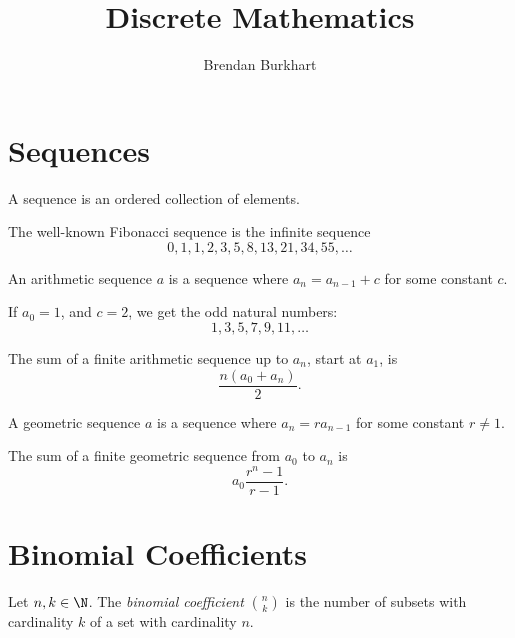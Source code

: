 \documentclass[12pt]{article}
\begin{document}
\title{Discrete Mathematics}
\author{Brendan Burkhart}
\maketitle

\tableofcontents
\newpage

\section{Sequences}

\begin{defn}
    A sequence is an ordered collection of elements.
\end{defn}

\begin{exmp}
    The well-known Fibonacci sequence is the infinite sequence \[0, 1, 1, 2, 3, 5, 8, 13, 21, 34, 55, \ldots\]
\end{exmp}

\begin{defn}
    An arithmetic sequence $a$ is a sequence where $a_n = a_{n-1} + c$ for some constant $c$.
\end{defn}

\begin{exmp}
    If $a_0 = 1$, and $c = 2$, we get the odd natural numbers: \[1, 3, 5, 7, 9, 11, \ldots\]
\end{exmp}

\begin{prop}
    The sum of a finite arithmetic sequence up to $a_n$, start at $a_1$, is \[\frac{n(a_0 + a_n)}{2}.\]
\end{prop}

\begin{defn}
    A geometric sequence $a$ is a sequence where $a_n = ra_{n-1}$ for some constant $r \neq 1$.
\end{defn}

\begin{prop}
    The sum of a finite geometric sequence from $a_0$ to $a_n$ is \[a_0\frac{r^n - 1}{r - 1}.\]
\end{prop}

\section{Binomial Coefficients}

\begin{defn}\label{binomial-coefficient}
Let $n, k \in \N$. The \emph{binomial coefficient} $\binom{n}{k}$ is the number of subsets with cardinality $k$ of a set with cardinality $n$.
\end{defn}
\end{document}
